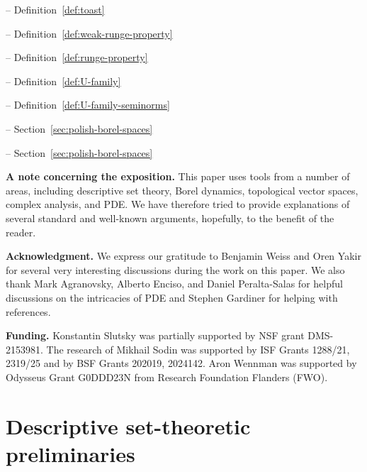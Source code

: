 \documentclass[12pt]{paper}
\numberwithin{equation}{section}
\theoremstyle{plain}
\theoremstyle{definition}
\newcommand{\mfR}{\mathfrak{R}}
\begin{document}
\begin{definitions}

\item[Borel toast \((\mathcal{C}_n,\lambda_n)_n\)] -- \qquad Definition~\ref{def:toast}

\item[\(\mfR\)-Runge property] -- \qquad Definition~\ref{def:weak-runge-property}

\item[\((\mfR,P)\)-Runge property] -- \qquad Definition~\ref{def:runge-property}

\item[\(a_Z\)-family of pseudometrics] -- \qquad Definition~\ref{def:U-family}

\item[\(\tau\)-family of seminorms] -- \qquad Definition~\ref{def:U-family-seminorms}

\item[Concrete classifiability] -- \qquad Section~\ref{sec:polish-borel-spaces}

\item[Borel transversal] -- \qquad Section~\ref{sec:polish-borel-spaces}
\end{definitions}

\bigskip

\noindent \textbf{A note concerning the exposition.} This paper uses tools from a number of areas,
including descriptive set theory, Borel dynamics, topological vector spaces, complex analysis, and
PDE.  We have therefore tried to provide explanations of several standard and well-known arguments,
hopefully, to the benefit of the reader.

\bigskip

\noindent \textbf{Acknowledgment.} We express our gratitude to Benjamin Weiss and Oren Yakir for
several very interesting discussions during the work on this paper. We also thank Mark Agranovsky,
Alberto Enciso, and Daniel Peralta-Salas for helpful discussions on the intricacies of PDE and
Stephen Gardiner for helping with references.

\bigskip

\noindent \textbf{Funding.}  Konstantin Slutsky was partially supported by NSF grant
DMS-2153981. The research of Mikhail Sodin was supported by ISF Grants 1288/21, 2319/25 and by BSF
Grants 202019, 2024142.  Aron Wennman was supported by Odysseus Grant G0DDD23N from Research
Foundation Flanders (FWO).


\section{Descriptive set-theoretic preliminaries}
\label{sec:preliminaries}
\end{document}
